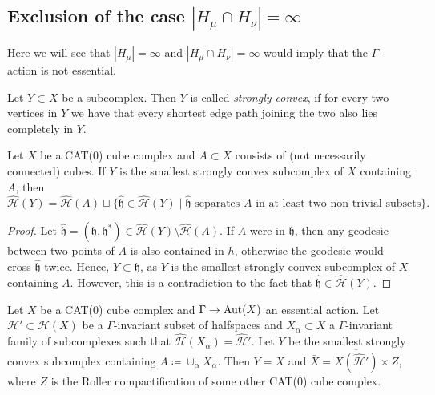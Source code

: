 \subsection{Exclusion of the case \(|H_\mu \cap H_\nu| = \infty\)}
\label{sec:M=infty}

Here we will see that \(|H_\mu| = \infty\) and \(|H_\mu \cap H_\nu| = \infty\) would imply that the \(\Gamma\)-action is not essential.

\begin{defin}
  Let \(Y \subset X\) be a subcomplex. Then \(Y\) is called \emph{strongly convex}, if for every two vertices in \(Y\) we have that every shortest edge path joining the two also lies completely in \(Y\).
\end{defin}

\begin{lemma}[{\cite[Lemma~4.16]{MR3509968}}]
  \label{lem:4.16}
  Let \(X\) be a CAT(0) cube complex and \(A \subset X\) consists of (not necessarily connected) cubes. If \(Y\) is the smallest strongly convex subcomplex of \(X\) containing \(A\), then
  \[
    \mathcal{\hat H}(Y) = \mathcal{\hat H}(A) \sqcup \{\mathfrak{\hat h} \in \mathcal{\hat H}(Y) \mid \mathfrak{\hat h} \text{ separates } A \text{ in at least two non-trivial subsets}\}.
  \]
\end{lemma}

\begin{proof}
  Let \(\mathfrak{\hat h} = (\mathfrak{h}, \mathfrak{h}^\ast) \in \mathcal{\hat H}(Y) \setminus \mathcal{\hat H}(A)\). If \(A\) were in \(\mathfrak{h}\), then any geodesic between two points of \(A\) is also contained in \(h\), otherwise the geodesic would cross \(\mathfrak{\hat h}\) twice. Hence, \(Y \subset \mathfrak{h}\), as \(Y\) is the smallest strongly convex subcomplex of \(X\) containing \(A\). However, this is a contradiction to the fact that \(\mathfrak{\hat h} \in \mathcal{\hat H}(Y)\).
\end{proof}

\begin{prop}[{\cite[Proposition~4.17]{MR3509968}}]
  \label{prop:4.17}
  Let \(X\) be a CAT(0) cube complex and \(\Gamma \to \operatorname{Aut}(X)\) an essential action. Let \(\mathcal{H}' \subset \mathcal{H}(X)\) be a \(\Gamma\)-invariant subset of halfspaces and \(X_\alpha \subset X\) a \(\Gamma\)-invariant family of subcomplexes such that \(\mathcal{\hat H}(X_\alpha) = \mathcal{\hat H}'\). Let \(Y\) be the smallest strongly convex subcomplex containing \(A \coloneqq \cup_\alpha X_\alpha\). Then \(Y = X\) and \(\bar X = \overline{X(\mathcal{\hat H}')} \times Z\), where \(Z\) is the Roller compactification of some other CAT(0) cube complex.
\end{prop}

